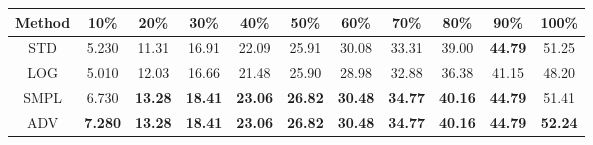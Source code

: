 \documentclass{standalone}
\begin{document}
\begin{tabular}{c|cccccccccc}
      \toprule
      Method & 10\% & 20\% & 30\% & 40\% & 50\% & 60\% & 70\% & 80\% & 90\% & 100\% \\
      \midrule
STD & 5.230 & 11.31 & 16.91 & 22.09 & 25.91 & 30.08 & 33.31 & 39.00 & \textbf{44.79} & 51.25\\
LOG & 5.010 & 12.03 & 16.66 & 21.48 & 25.90 & 28.98 & 32.88 & 36.38 & 41.15 & 48.20\\
SMPL & 6.730 & \textbf{13.28} & \textbf{18.41} & \textbf{23.06} & \textbf{26.82} & \textbf{30.48} & \textbf{34.77} & \textbf{40.16} & \textbf{44.79} & 51.41\\
ADV & \textbf{7.280} & \textbf{13.28} & \textbf{18.41} & \textbf{23.06} & \textbf{26.82} & \textbf{30.48} & \textbf{34.77} & \textbf{40.16} & \textbf{44.79} & \textbf{52.24}\\
  \bottomrule
\end{tabular}
\end{document}
